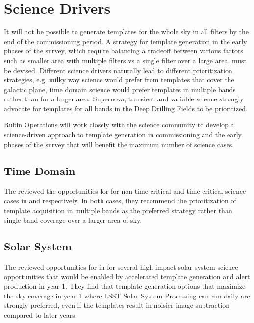 \section{Science Drivers} \label{sec:science}

It will not be possible to generate templates for the whole sky in all filters by the end of the commissioning period. 
A strategy for template generation in the early phases of the survey, which require balancing a tradeoff between various factors such as smaller area with multiple filters vs a single filter over a large area, must be devised. 
Different science drivers naturally lead to different prioritization strategies, e.g. milky way science would prefer from templates that cover the galactic plane, time domain science would prefer templates in multiple bands rather than for a larger area. 
Supernova, transient and variable science strongly advocate for templates for all bands in the Deep Drilling Fields to be prioritized. 

Rubin Operations will work closely with the science community to develop a science-driven approach to template generation in commissioning and the early phases of the survey that will benefit the maximum number of science cases. 

\subsection{Time Domain}

The \tvssc reviewed the opportunities for \es for non time-critical and time-critical science cases in \citep{Hambleton_2020} and \citep{Street_2020} respectively. 
In both cases, they recommend the prioritization of template acquisition in multiple bands as the preferred strategy rather than single band  coverage over a larger area of sky. 

\subsection{Solar System}

The \sssc reviewed opportunities for \es in \citep{2020arXiv201005926L} for several high impact solar system science opportunities that would be enabled by accelerated template generation and alert production in year 1. 
They find that template generation options that maximize the sky coverage in year 1 where LSST Solar System Processing can run daily are strongly preferred, even if the templates result in noisier image subtraction compared to later years.

